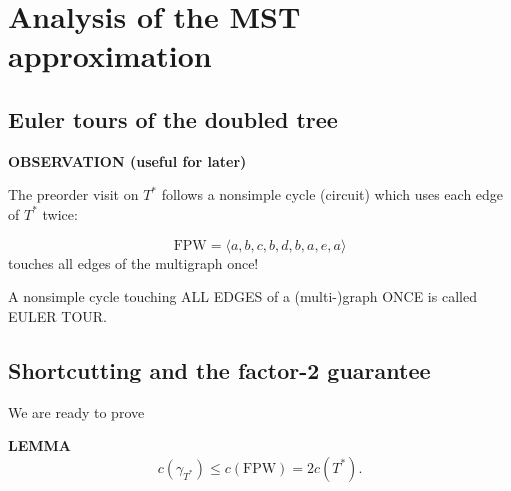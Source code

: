 \section{Analysis of the MST approximation}
\subsection{Euler tours of the doubled tree}
\begin{notesresult}
\textbf{OBSERVATION (useful for later)}

The preorder visit on $T^*$ follows a nonsimple cycle (circuit) which uses each edge of $T^*$ twice:
\end{notesresult}
\[\mathrm{FPW}=\langle a,b,c,b,d,b,a,e,a\rangle\]
touches all edges of the multigraph once!

A nonsimple cycle touching ALL EDGES of a (multi-)graph ONCE is called EULER TOUR.

\subsection{Shortcutting and the factor-2 guarantee}
We are ready to prove
\begin{notesresult}
\textbf{LEMMA}
\[c(\gamma_{T^*})\leq c(\mathrm{FPW})=2c(T^*).\]
\end{notesresult}
